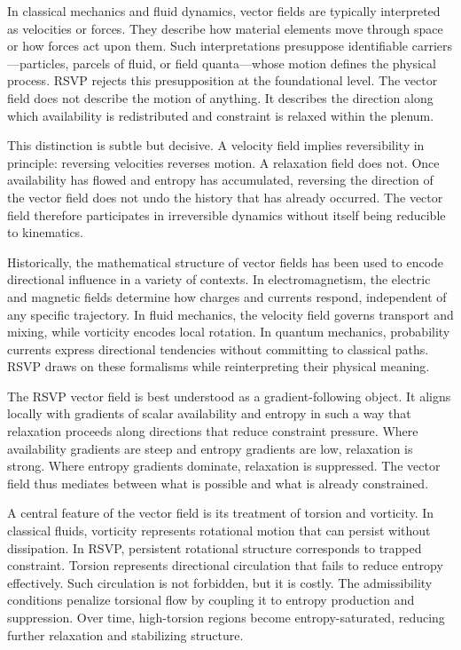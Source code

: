 \documentclass[11pt,oneside]{book}
\begin{document}
In classical mechanics and fluid dynamics, vector fields are typically interpreted as velocities or forces. They describe how material elements move through space or how forces act upon them. Such interpretations presuppose identifiable carriers—particles, parcels of fluid, or field quanta—whose motion defines the physical process. RSVP rejects this presupposition at the foundational level. The vector field does not describe the motion of anything. It describes the direction along which availability is redistributed and constraint is relaxed within the plenum.

This distinction is subtle but decisive. A velocity field implies reversibility in principle: reversing velocities reverses motion. A relaxation field does not. Once availability has flowed and entropy has accumulated, reversing the direction of the vector field does not undo the history that has already occurred. The vector field therefore participates in irreversible dynamics without itself being reducible to kinematics.

Historically, the mathematical structure of vector fields has been used to encode directional influence in a variety of contexts. In electromagnetism, the electric and magnetic fields determine how charges and currents respond, independent of any specific trajectory. In fluid mechanics, the velocity field governs transport and mixing, while vorticity encodes local rotation. In quantum mechanics, probability currents express directional tendencies without committing to classical paths. RSVP draws on these formalisms while reinterpreting their physical meaning.

The RSVP vector field is best understood as a gradient-following object. It aligns locally with gradients of scalar availability and entropy in such a way that relaxation proceeds along directions that reduce constraint pressure. Where availability gradients are steep and entropy gradients are low, relaxation is strong. Where entropy gradients dominate, relaxation is suppressed. The vector field thus mediates between what is possible and what is already constrained.

A central feature of the vector field is its treatment of torsion and vorticity. In classical fluids, vorticity represents rotational motion that can persist without dissipation. In RSVP, persistent rotational structure corresponds to trapped constraint. Torsion represents directional circulation that fails to reduce entropy effectively. Such circulation is not forbidden, but it is costly. The admissibility conditions penalize torsional flow by coupling it to entropy production and suppression. Over time, high-torsion regions become entropy-saturated, reducing further relaxation and stabilizing structure.
\end{document}
